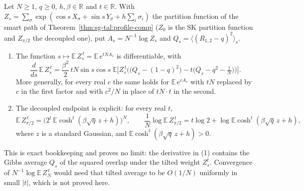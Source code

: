 \begin{theorem}\label{thm:sg-tal:replica-real-moment-path}
  \leanok
Let $N\ge1$, $q\ge0$, $h,\beta\in\mathbb R$ and $t\in\mathbb R$. With $Z_s=\sum_\sigma\exp(\cos s\,X_\sigma+\sin s\,Y_\sigma+h\sum_i\sigma_i)$ the partition function of the smart path of Theorem~\ref{thm:sg-tal:profile-comp} ($Z_0$ is the SK partition function and $Z_{\pi/2}$ the decoupled one), put $A_s=N^{-1}\log Z_s$ and $Q_s=\langle(R_{1,2}-q)^2\rangle_s$.
\begin{enumerate}
\item The function $s\mapsto\mathbb E\,Z_s^{\,t}=\mathbb E\,e^{tNA_s}$ is differentiable, with
\[
\frac{d}{ds}\,\mathbb E\,Z_s^{\,t}=\frac{\beta^2}{2}\,tN\sin s\cos s\;\mathbb E\Big[Z_s^{\,t}\Big(\big(Q_s-(1-q)^2\big)-t\big(Q_s-q^2-\tfrac1N\big)\Big)\Big].
\]
More generally, for every real $c$ the same holds for $\mathbb E\,e^{cA_s}$ with $tN$ replaced by $c$ in the first factor and with $c^2/N$ in place of $tN\cdot t$ in the second.
\item The decoupled endpoint is explicit: for every real $t$,
\[
\mathbb E\,Z_{\pi/2}^{\,t}=\Big(2^t\,\mathbb E\cosh^t(\beta\sqrt q\,z+h)\Big)^N,\qquad
\frac1N\log\mathbb E\,Z_{\pi/2}^{\,t}=t\log2+\log\mathbb E\cosh^t(\beta\sqrt q\,z+h),
\]
where $z$ is a standard Gaussian, and $\mathbb E\cosh^t(\beta\sqrt q\,z+h)>0$.
\end{enumerate}
This is exact bookkeeping and proves no limit: the derivative in (1) contains the Gibbs average $Q_s$ of the squared overlap under the tilted weight $Z_s^t$. Convergence of $N^{-1}\log\mathbb E\,Z_N^{\,t}$ would need that tilted average to be $O(1/N)$ uniformly in small $|t|$, which is not proved here.
\end{theorem}
